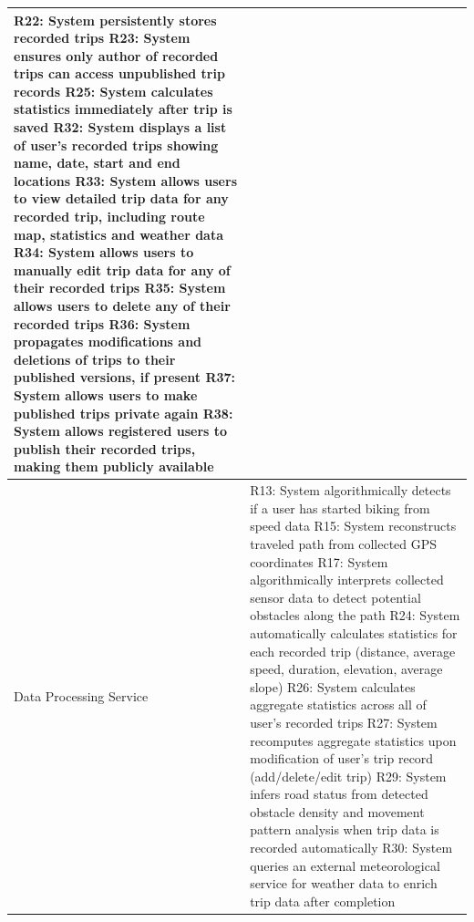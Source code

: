 \begin{longtable}{|p{3cm}|p{13cm}|}
   R22: System persistently stores recorded trips \newline
   R23: System ensures only author of recorded trips can access unpublished trip records \newline
   R25: System calculates statistics immediately after trip is saved \newline
   R32: System displays a list of user’s recorded trips showing name, date, start and end locations \newline
   R33: System allows users to view detailed trip data for any recorded trip, including route map, statistics and weather data \newline
   R34: System allows users to manually edit trip data for any of their recorded trips \newline
   R35: System allows users to delete any of their recorded trips \newline
   R36: System propagates modifications and deletions of trips to their published versions, if present \newline
   R37: System allows users to make published trips private again \newline
   R38: System allows registered users to publish their recorded trips, making them publicly available \\ \hline
   Data Processing Service & 
   R13: System algorithmically detects if a user has started biking from speed data \newline
   R15: System reconstructs traveled path from collected GPS coordinates \newline
   R17: System algorithmically interprets collected sensor data to detect potential obstacles along the path \newline
   R24: System automatically calculates statistics for each recorded trip (distance, average speed, duration, elevation, average slope) \newline
   R26: System calculates aggregate statistics across all of user’s recorded trips \newline
   R27: System recomputes aggregate statistics upon modification of user’s trip record (add/delete/edit trip) \newline
   R29: System infers road status from detected obstacle density and movement pattern analysis when trip data is recorded automatically \newline
   R30: System queries an external meteorological service for weather data to enrich trip data after completion \\ \hline

\end{longtable}
